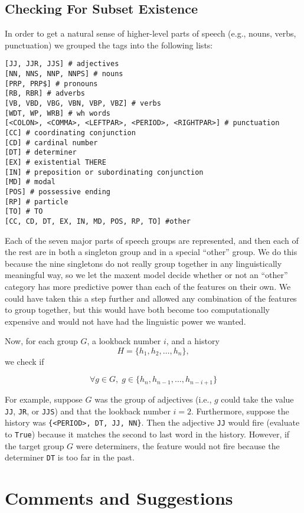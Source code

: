 \documentclass[11pt]{article}
\begin{document}
\subsection{Checking For Subset Existence}
\label{sec:subset-existence}

In order to get a natural sense of higher-level parts of speech (e.g., nouns, verbs, punctuation) we grouped the tags into the following lists:

\begin{verbatim}
[JJ, JJR, JJS] # adjectives
[NN, NNS, NNP, NNPS] # nouns
[PRP, PRP$] # pronouns
[RB, RBR] # adverbs
[VB, VBD, VBG, VBN, VBP, VBZ] # verbs
[WDT, WP, WRB] # wh words
[<COLON>, <COMMA>, <LEFTPAR>, <PERIOD>, <RIGHTPAR>] # punctuation
[CC] # coordinating conjunction
[CD] # cardinal number
[DT] # determiner
[EX] # existential THERE
[IN] # preposition or subordinating conjunction
[MD] # modal
[POS] # possessive ending
[RP] # particle
[TO] # TO
[CC, CD, DT, EX, IN, MD, POS, RP, TO] #other
\end{verbatim}

Each of the seven major parts of speech groups are represented, and then each
of the rest are in both a singleton group and in a special ``other'' group. We
do this because the nine singletons do not really group together in any
linguistically meaningful way, so we let the maxent model decide whether or
not an ``other'' category has more predictive power than each of the features
on their own. We could have taken this a step further and allowed any
combination of the features to group together, but this would have both become
too computationally expensive and would not have had the linguistic power we
wanted.

Now, for each group $G$, a lookback number $i$, and a history \[ H = \{h_1,
h_2, \dots, h_n\},\] we check if

\[ \forall g \in G,\; g \in \{h_{n}, h_{n-1}, \ldots, h_{n-i+1}\}  \]

For example, suppose $G$ was the group of adjectives (i.e., $g$ could take the
value \texttt{JJ}, \texttt{JR}, or \texttt{JJS}) and that the lookback number
$i = 2$. Furthermore, suppose the history was \texttt{\{<PERIOD>, DT, JJ,
NN\}}. Then the adjective \texttt{JJ} would fire (evaluate to \texttt{True})
because it matches the second to last word in the history. However, if the
target group $G$ were determiners, the feature would not fire because the
determiner \texttt{DT} is too far in the past.

\section{Comments and Suggestions}
\end{document}
